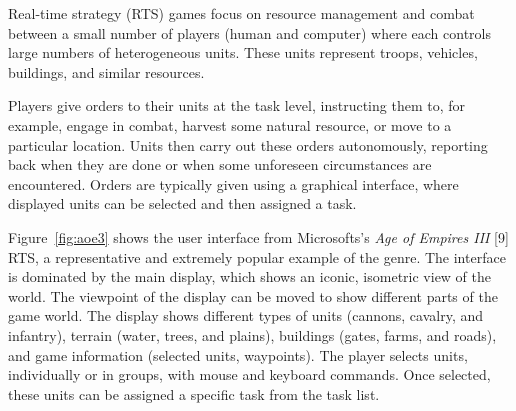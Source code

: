 
Real-time strategy (RTS) games focus on resource management and combat between a small number of players (human and computer) where each controls large numbers of heterogeneous units. These units represent troops, vehicles, buildings, and similar resources.

Players give orders to their units at the task level, instructing them to, for example, engage in combat, harvest some natural resource, or move to a particular location. Units then carry out these orders autonomously, reporting back when they are done or when some unforeseen circumstances are encountered. Orders are typically given using a graphical interface, where displayed units can be selected and then assigned a task.

Figure~\ref{fig:aoe3} shows the user interface from Microsofts's \emph{Age of Empires III} [9] RTS, a representative and extremely popular example of the genre. The interface is dominated by the main display, which shows an iconic, isometric view of the world. The viewpoint of the display can be moved to show different parts of the game world. The display shows different types of units (cannons, cavalry, and infantry), terrain (water, trees, and plains), buildings (gates, farms, and roads), and game information (selected units, waypoints). The player selects units, individually or in groups, with mouse and keyboard commands. Once selected, these units can be assigned a specific task from the task list.

